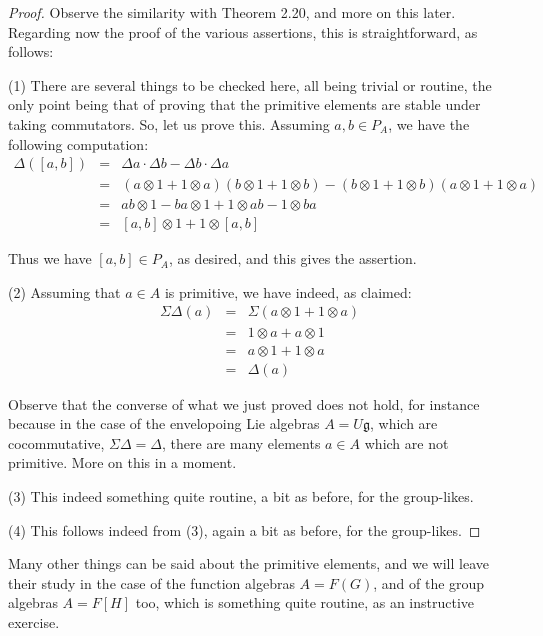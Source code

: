 \documentclass[12pt]{amsbook}
\begin{document}
\begin{proof}
Observe the similarity with Theorem 2.20, and more on this later. Regarding now the proof of the various assertions, this is straightforward, as follows:

\medskip

(1) There are several things to be checked here, all being trivial or routine, the only point being that of proving that the primitive elements are stable under taking commutators. So, let us prove this. Assuming $a,b\in P_A$, we have the following computation:
\begin{eqnarray*}
\Delta([a,b])
&=&\Delta a\cdot\Delta b-\Delta b\cdot\Delta a\\
&=&(a\otimes 1+1\otimes a)(b\otimes 1+1\otimes b)-(b\otimes 1+1\otimes b)(a\otimes 1+1\otimes a)\\
&=&ab\otimes 1-ba\otimes 1+1\otimes ab-1\otimes ba\\
&=&[a,b]\otimes 1+1\otimes[a,b]
\end{eqnarray*}

Thus we have $[a,b]\in P_A$, as desired, and this gives the assertion.

\medskip

(2) Assuming that $a\in A$ is primitive, we have indeed, as claimed:
\begin{eqnarray*}
\Sigma\Delta(a)
&=&\Sigma(a\otimes 1+1\otimes a)\\
&=&1\otimes a+a\otimes 1\\
&=&a\otimes 1+1\otimes a\\
&=&\Delta(a)
\end{eqnarray*}

Observe that the converse of what we just proved does not hold, for instance because in the case of the envelopoing Lie algebras $A=U\mathfrak g$, which are cocommutative, $\Sigma\Delta=\Delta$, there are many elements $a\in A$ which are not primitive. More on this in a moment.

\medskip

(3) This indeed something quite routine, a bit as before, for the group-likes.

\medskip

(4) This follows indeed from (3), again a bit as before, for the group-likes.
\end{proof}

Many other things can be said about the primitive elements, and we will leave their study in the case of the function algebras $A=F(G)$, and of the group algebras $A=F[H]$ too, which is something quite routine, as an instructive exercise.
\end{document}
